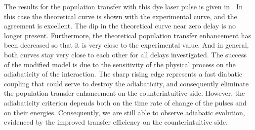 \begin{figure}[tbp]
\bigskip
{}
\end{figure}

The results for the population transfer with this dye laser pulse is given in
.  In this case the theoretical curve is shown with the
experimental curve, and the agreement is excellent.  The dip in the theoretical
curve near zero delay is no longer present.  Furthermore, the
theoretical population transfer enhancement has been decreased so that it is
very close to the experimental value.  And in general, both curves stay very
close to each other for all delays investigated.  The success of the modified
model is due to the sensitivity of the physical process on the adiabaticity of
the interaction.  The sharp rising edge represents a fast diabatic coupling
that could serve to destroy the adiabaticity, and consequently eliminate the
population transfer enhancement on the counterintuitive side.  However, the
adiabaticity criterion depends both on the time rate of change of the pulses
and on their energies.  Consequently, we are still able to observe adiabatic
evolution, evidenced by the improved transfer efficiency on the counterintuitive
side.

\begin{figure}[tbp]
\bigskip
{}
\end{figure}

